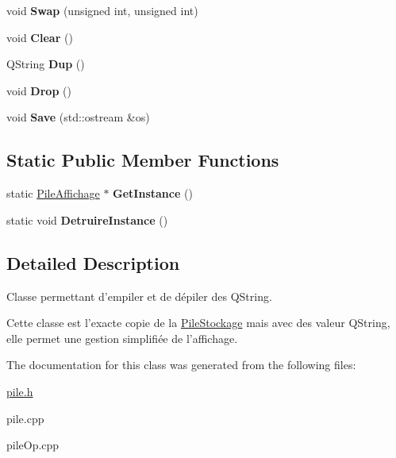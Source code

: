 \begin{DoxyCompactItemize}
\item 
\hypertarget{class_pile_affichage_a5768dff9a1bf067cd7ae10567c0dd6a8}{void {\bfseries Swap} (unsigned int, unsigned int)}\label{class_pile_affichage_a5768dff9a1bf067cd7ae10567c0dd6a8}

\item 
\hypertarget{class_pile_affichage_a6676383310776eb66f40ff03095193a3}{void {\bfseries Clear} ()}\label{class_pile_affichage_a6676383310776eb66f40ff03095193a3}

\item 
\hypertarget{class_pile_affichage_a1fbdf1c3578bf2d3d958595f820ae831}{Q\-String {\bfseries Dup} ()}\label{class_pile_affichage_a1fbdf1c3578bf2d3d958595f820ae831}

\item 
\hypertarget{class_pile_affichage_adccff01313daf3c1c7666154549ae4ae}{void {\bfseries Drop} ()}\label{class_pile_affichage_adccff01313daf3c1c7666154549ae4ae}

\item 
\hypertarget{class_pile_affichage_a0cb7b0b675468c8670c6260c3c75d203}{void {\bfseries Save} (std\-::ostream \&os)}\label{class_pile_affichage_a0cb7b0b675468c8670c6260c3c75d203}

\end{DoxyCompactItemize}
\subsection*{Static Public Member Functions}
\begin{DoxyCompactItemize}
\item 
\hypertarget{class_pile_affichage_ae25f21273bf5d03ad1de209b622992a3}{static \hyperlink{class_pile_affichage}{Pile\-Affichage} $\ast$ {\bfseries Get\-Instance} ()}\label{class_pile_affichage_ae25f21273bf5d03ad1de209b622992a3}

\item 
\hypertarget{class_pile_affichage_a1bf96ebc64e812b39f26f821b3a65f4f}{static void {\bfseries Detruire\-Instance} ()}\label{class_pile_affichage_a1bf96ebc64e812b39f26f821b3a65f4f}

\end{DoxyCompactItemize}


\subsection{Detailed Description}
Classe permettant d'empiler et de dépiler des Q\-String. 

Cette classe est l'exacte copie de la \hyperlink{class_pile_stockage}{Pile\-Stockage} mais avec des valeur Q\-String, elle permet une gestion simplifiée de l'affichage. 

The documentation for this class was generated from the following files\-:\begin{DoxyCompactItemize}
\item 
\hyperlink{pile_8h}{pile.\-h}\item 
pile.\-cpp\item 
pile\-Op.\-cpp\end{DoxyCompactItemize}
